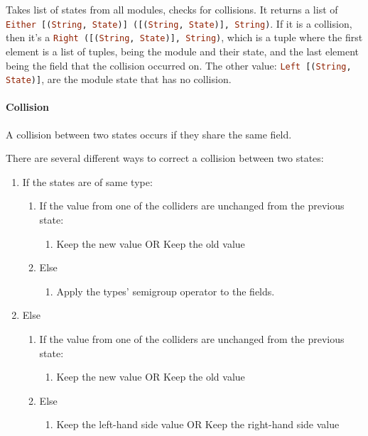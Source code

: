 Takes list of states from all modules, checks for collisions. It returns a
list of
\lstinline[language=Haskell]{Either [(String, State)] ([(String, State)], String)}.
If it is a collision, then it's a
\lstinline[language=Haskell]{Right ([(String, State)], String)}, which is a
tuple where the first element is a list of tuples, being the module and their
state, and the last element being the field that the collision occurred on.
The other value: \lstinline[language=Haskell]{Left [(String, State)]}, are the
module state that has no collision.

\paragraph{Collision} A collision between two states occurs if they share the same
field.

There are several different ways to correct a collision between two
states:

\begin{enumerate}
  \item If the states are of same type:
    \begin{enumerate}
      \item If the value from one of the colliders are unchanged from the previous state:
        \begin{enumerate}
          \item Keep the new value OR Keep the old value
        \end{enumerate}
      \item Else
        \begin{enumerate}
          \item Apply the types' semigroup operator to the fields.
        \end{enumerate}
    \end{enumerate}
  \item Else
    \begin{enumerate}
      \item If the value from one of the colliders are unchanged from the previous state:
        \begin{enumerate}
          \item Keep the new value OR Keep the old value
        \end{enumerate}
      \item Else
        \begin{enumerate}
          \item Keep the left-hand side value OR Keep the right-hand side value
        \end{enumerate}
    \end{enumerate}
\end{enumerate}

